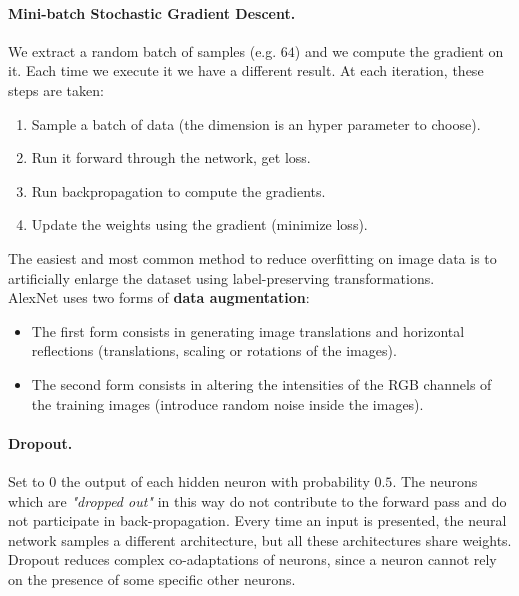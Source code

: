 \paragraph*{Mini-batch Stochastic Gradient Descent.} We extract a random batch of samples (e.g. $64$) and we compute the gradient on it. Each time we execute it we have a different result. At each iteration, these steps are taken:
\begin{enumerate}
	\item Sample a batch of data (the dimension is an hyper parameter to choose).
	\item Run it forward through the network, get loss.
	\item Run backpropagation to compute the gradients.
	\item Update the weights using the gradient (minimize loss).
\end{enumerate} 

The easiest and most common method to reduce overfitting on image data is to artificially enlarge the dataset using label-preserving transformations.\\
AlexNet uses two forms of \textbf{data augmentation}:
\begin{itemize}
	\item The first form consists in generating image translations and horizontal reflections (translations, scaling or rotations of the images).
	\item The second form consists in altering the intensities of the RGB channels of the training images (introduce random noise inside the images). 
\end{itemize}


\paragraph*{Dropout.} Set to 0 the output of each hidden neuron with probability $0.5$. The neurons which are \textit{"dropped out"} in this way do not contribute to the forward pass and do not participate in back-propagation. Every time an input is presented, the neural network samples a different architecture, but all these architectures share weights.\\
Dropout reduces complex co-adaptations of neurons, since a neuron cannot rely on the presence of some specific other neurons.
